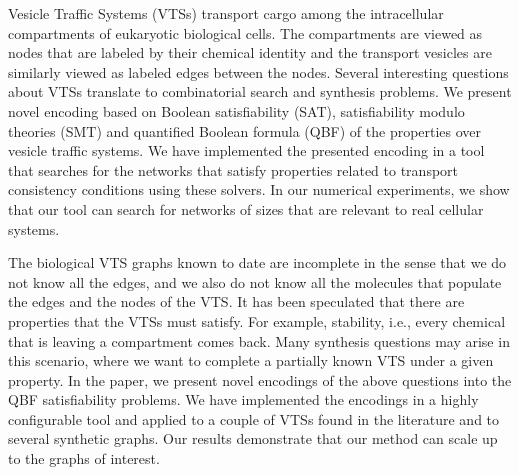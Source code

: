 Vesicle Traffic Systems (VTSs) transport cargo among the intracellular compartments of eukaryotic biological cells.
%
The compartments are viewed as nodes that are labeled by their chemical identity and the transport vesicles are similarly viewed as labeled edges between the nodes.
%
Several interesting questions about VTSs translate to combinatorial search and synthesis problems. 
%
We present novel encoding based on Boolean satisfiability (SAT), satisfiability modulo theories (SMT) and quantified Boolean formula (QBF) of the properties over vesicle traffic systems.
%
We have implemented the presented encoding in a tool that searches for the networks that satisfy properties related to transport consistency conditions using these solvers. 
%
In our numerical experiments, we show that our tool can search for networks of sizes that are relevant to real cellular systems.

%
%
%
The biological VTS graphs known to date are incomplete in the sense that we do not know all the edges, and we also do not know all the molecules that populate the edges and the nodes of the VTS.
%
%
It has been speculated that there are properties that the VTSs must satisfy.
For example, stability, i.e., every chemical that is leaving a compartment
comes back. 
%
Many synthesis questions may arise in this scenario, where we want to complete a partially known VTS under a given property.
%
In the paper, we present novel encodings of the above questions into
the QBF satisfiability problems. 
%
We have implemented the encodings in a highly configurable tool and applied to a couple of VTSs found in the literature and to several synthetic graphs.
%
Our results demonstrate that our method can scale up to the graphs of interest.

